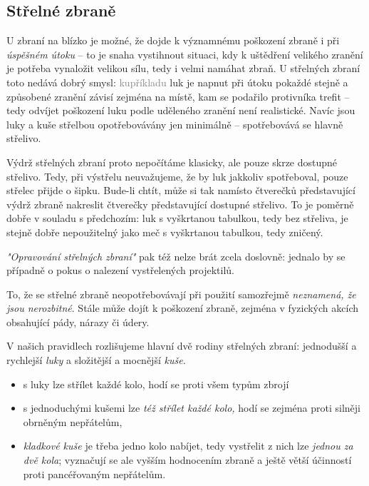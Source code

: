 \documentclass[../main.tex]{subfiles}
\begin{document}
\subsection{Střelné zbraně}
\label{sec:strelne}

U zbraní na blízko je možné, že dojde k významnému poškození zbraně i při \emph{úspěšném útoku} – to je snaha vystihnout situaci, kdy k uštědření velikého zranění je potřeba vynaložit velikou sílu, tedy i velmi namáhat zbraň. U střelných zbraní toto nedává dobrý smysl: \textcolor{gray}{kupříkladu} luk je napnut při útoku pokaždé stejně a způsobené zranění závisí zejména na místě, kam se podařilo protivníka trefit – tedy odvíjet poškození luku podle uděleného zranění není realistické. Navíc jsou luky a kuše střelbou opotřebovávány jen minimálně  – spotřebovává se hlavně střelivo.

Výdrž střelných zbraní proto nepočítáme klasicky, ale pouze skrze dostupné střelivo. Tedy, při výstřelu neuvažujeme, že by luk jakkoliv spotřeboval, pouze střelec přijde o šipku. Bude-li chtít, může si tak namísto čtverečků představující výdrž zbraně nakreslit čtverečky představující dostupné střelivo. To je poměrně dobře v souladu s předchozím: luk s vyškrtanou tabulkou, tedy bez střeliva, je stejně dobře nepoužitelný jako meč s vyškrtanou tabulkou, tedy zničený.

\emph{"Opravování střelných zbraní"} pak též nelze brát zcela doslovně: jednalo by se případně o pokus o nalezení vystřelených projektilů.


\begin{poznámka}
	To, že se střelné zbraně neopotřebovávají při použití samozřejmě \emph{neznamená, že jsou nerozbitné}. Stále může dojít k poškození zbraně, zejména v fyzických akcích obsahující pády, nárazy či údery.
\end{poznámka}


V našich pravidlech rozlišujeme hlavní dvě rodiny střelných zbraní: jednodušší a rychlejší \emph{luky} a složitější a mocnější \emph{kuše.}

\begin{itemize}
	\item s luky lze střílet každé kolo, hodí se proti všem typům zbrojí
	\item s jednoduchými kušemi lze \emph{též střílet každé kolo,} hodí se zejména proti silněji obrněným nepřátelům,
	\item  \emph{kladkové kuše} je třeba jedno kolo nabíjet, tedy vystřelit z nich lze \emph{jednou za dvě kola}; vyznačují se ale vyšším hodnocením zbraně a ještě větší účinností proti pancéřovaným nepřátelům.
\end{itemize}
\end{document}

